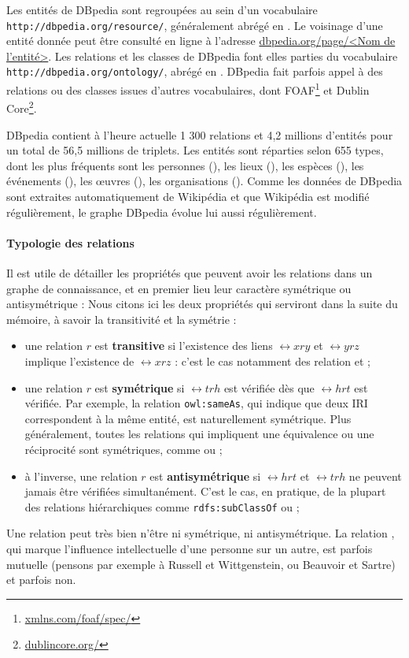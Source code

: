 Les entités de DBpedia sont regroupées au sein d'un vocabulaire \texttt{http://dbpedia.org/resource/}, généralement abrégé en \dbr{}. Le voisinage d'une entité donnée  %
peut être consulté en ligne à l'adresse \href{http://dbpedia.org/page/<Nom de l'entité>}{dbpedia.org/page/<Nom de l'entité>}. Les relations et les classes de DBpedia font elles parties du vocabulaire \texttt{http://dbpedia.org/ontology/}, abrégé en \dbo{}. DBpedia fait parfois appel à des relations ou des classes issues d'autres vocabulaires, dont FOAF\footnote{\href{http://xmlns.com/foaf/spec/}{xmlns.com/foaf/spec/}} et Dublin Core\footnote{\href{https://dublincore.org/}{dublincore.org/}}.


DBpedia contient à l'heure actuelle 1 300 relations et 4,2 millions d'entités pour un total de 56,5 millions de triplets. Les entités sont réparties selon 655 types, dont les plus fréquents sont les personnes (), les lieux (), les espèces (), les événements (), les œuvres (), les organisations (). Comme les données de DBpedia sont extraites automatiquement de Wikipédia et que Wikipédia est modifié régulièrement, le graphe DBpedia évolue lui aussi régulièrement.


\paragraph{Typologie des relations} 

Il est utile de détailler les propriétés que peuvent avoir les relations dans un graphe de connaissance, et en premier lieu leur caractère symétrique ou antisymétrique :
Nous citons ici les deux propriétés qui serviront dans la suite du mémoire, à savoir la transitivité et la symétrie :
\begin{itemize}
    \item une relation $r$ est \textbf{transitive} si l'existence des liens $\rel{x}{r}{y}$ et $\rel{y}{r}{z}$ implique l'existence de $\rel{x}{r}{z}$ : c'est le cas notamment des relation  et ;
    \item une relation $r$ est \textbf{symétrique} si $\rel{t}{r}{h}$ est vérifiée dès que $\rel{h}{r}{t}$ est vérifiée. Par exemple, la relation \texttt{owl:sameAs}, qui indique que deux IRI correspondent à la même entité, est naturellement symétrique. Plus généralement, toutes les relations qui impliquent une équivalence ou une réciprocité sont symétriques, comme  ou ;
    \item à l'inverse, une relation $r$ est \textbf{antisymétrique} si $\rel{h}{r}{t}$ et $\rel{t}{r}{h}$ ne peuvent jamais être vérifiées simultanément. C'est le cas, en pratique, de la plupart des relations hiérarchiques comme \texttt{rdfs:subClassOf} ou ;
\end{itemize}
Une relation peut très bien n'être ni symétrique, ni antisymétrique. La relation , qui marque l'influence intellectuelle d'une personne sur un autre, est parfois mutuelle (pensons par exemple à Russell et Wittgenstein, ou Beauvoir et Sartre) et parfois non.


